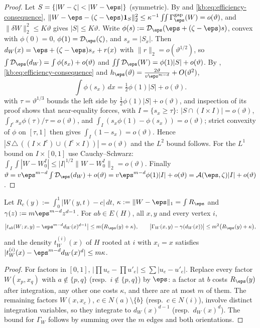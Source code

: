 \begin{proof}
Let $S=\{|W-\zeta|<|W-\eps|\}$ (symmetric).  By  and
\eqref{kb:eq:efficiency-consequence},
$\|W-\eps-(\zeta-\eps)\mathbf 1_S\|_2^2\le\kappa^{-1}\iint\Gamma^{\mathrm{gap}}_\eps(W)
=o(\vartheta)$, and $\|\delta W\|_2^2\le K\vartheta$ gives $|S|\le K\vartheta$.
Write $\phi(s):=\mathcal D_\eps(\eps+(\zeta-\eps)s)$, convex with $\phi(0)=0$,
$\phi(1)=\mathcal D_\eps(\zeta)$, and $s_x=|S_x|$.  Then
$d_W(x)=\eps+(\zeta-\eps)s_x+r(x)$ with $\|r\|_2=o(\vartheta^{1/2})$, so
$\int\mathcal D_\eps(d_W)=\int\phi(s_x)+o(\vartheta)$ and
$\iint\mathcal D_\eps(W)=\phi(1)|S|+o(\vartheta)$.  By ,
\eqref{kb:eq:efficiency-consequence} and $h_\eps(\vartheta)=
\frac{2\vartheta}{v\eps^{m-d}}+O(\vartheta^2)$,
\[
  \int\phi(s_x)\,dx=\tfrac12\phi(1)|S|+o(\vartheta).
\]
 with $\tau=\vartheta^{1/3}$ bounds the left side by
$\frac12\phi(1)|S|+o(\vartheta)$, and inspection of its proof shows that
near-equality forces, with $I=\{s_x\ge\tau\}$: $|S\cap(I\times I)|=o(\vartheta)$,
$\int_{I^c}s_x\phi(\tau)/\tau=o(\vartheta)$, and
$\int_I(s_x\phi(1)-\phi(s_x))=o(\vartheta)$; strict convexity of $\phi$ on
$[\tau,1]$ then gives $\int_I(1-s_x)=o(\vartheta)$.  Hence
$|S\,\triangle\,((I\times I^c)\cup(I^c\times I))|=o(\vartheta)$ and the $L^2$ bound
follows.  For the $L^1$ bound on $I\times[0,1]$ use Cauchy--Schwarz:
$\int_I\int|W-W_0^I|\le|I|^{1/2}\|W-W_0^I\|_2=o(\vartheta)$.  Finally
$\vartheta=v\eps^{m-d}\int\mathcal D_\eps(d_W)+o(\vartheta)
=v\eps^{m-d}\phi(1)|I|+o(\vartheta)=\mathcal A(\eps,\zeta)|I|+o(\vartheta)$.
\end{proof}


\begin{lemma}\label{kb:lem:pinned}
Let $R_c(y):=\int_0^1|W(y,t)-c|\,dt$, $\kappa:=\|W-\eps\|_1=\int R_\eps$ and
$\gamma(z):=m\eps^{m-d}z^{d-1}$.  For $ab\in E(H)$, all $x,y$ and every vertex $i$,
\[
  \bigl|t_{ab}(W;x,y)-\eps^{m-d}d_W(x)^{d-1}\bigr|\le m\bigl(R_\eps(y)+\kappa\bigr),
  \qquad
  \bigl|\Gamma_W(x,y)-\gamma(d_W(x))\bigr|\le m^2\bigl(R_\eps(y)+\kappa\bigr),
\]
and the density $t^{(i)}_W(x)$ of $H$ rooted at $i$ with $x_i=x$ satisfies
$|t^{(i)}_W(x)-\eps^{m-d}d_W(x)^d|\le m\kappa$.
\end{lemma}

\begin{proof}
For factors in $[0,1]$, $|\prod u_e-\prod u'_e|\le\sum|u_e-u'_e|$.  Replace every factor
$W(x_p,x_q)$ with $a\notin\{p,q\}$ (resp.\ $i\notin\{p,q\}$) by $\eps$: a factor at $b$ costs
$R_\eps(y)$ after integration, any other one costs $\kappa$, and there are at most $m$ of
them.  The remaining factors $W(x,x_c)$, $c\in N(a)\setminus\{b\}$ (resp.\ $c\in N(i)$), involve
distinct integration variables, so they integrate to $d_W(x)^{d-1}$ (resp.\ $d_W(x)^d$).  The
bound for $\Gamma_W$ follows by summing over the $m$ edges and both orientations.
\end{proof}

